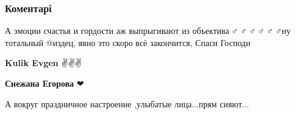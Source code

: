  
 
 
 
 
\subsubsection{Коментарі}
\label{sec:24_08_2021.fb.egorova_snezhana.1.devochka_i_soldat.cmt}

\begin{itemize}
 
А эмоции счастья и гордости аж выпрыгивают из объектива🤦♂️🤦♂️🤦♂️🤦♂️🤦♂️🤦♂️ну
тотальный @издец, явно это скоро всё закончится, Спаси Господи🙏

\begin{itemize}
 
\textbf{Kulik Evgen} ✌️✌️✌️

 
\textbf{Снежана Егорова} ❤
\end{itemize}

 
А вокруг праздничное настроение ,улыбатые лица...прям сияют...

\begin{itemize}
 

\end{itemize}
\end{itemize}
